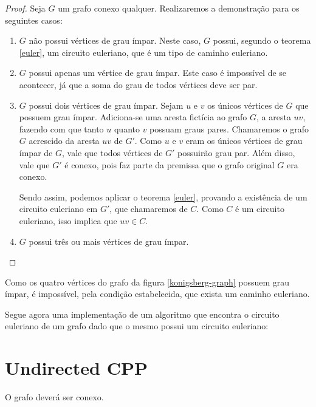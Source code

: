 \documentclass{article}
\begin{document}
\begin{proof}
    Seja $G$ um grafo conexo qualquer. Realizaremos a demonstração para os seguintes casos:
    \begin{enumerate}
        \item $G$ não possui vértices de grau ímpar. Neste caso, $G$ possui, segundo o teorema \ref{euler}, um circuito euleriano, que é um tipo de caminho euleriano.
        
        \item $G$ possui apenas um vértice de grau ímpar. Este caso é impossível de se acontecer, já que a soma do grau de todos vértices deve ser par.
        
        \item $G$ possui dois vértices de grau ímpar. 
        Sejam $u$ e $v$ os únicos vértices de $G$ que possuem grau ímpar.
        Adiciona-se uma aresta fictícia ao grafo $G$, a aresta $uv$, fazendo com que tanto $u$ quanto $v$ possuam graus pares. 
		Chamaremos o grafo $G$ acrescido da aresta $uv$ de $G'$.
        Como $u$ e $v$ eram os únicos vértices de grau ímpar de $G$, vale que todos vértices de $G'$ possuirão grau par. 
		Além disso, vale que $G'$ é conexo, pois faz parte da premissa que o grafo original $G$ era conexo.

        Sendo assim, podemos aplicar o teorema \ref{euler}, provando a existência de um circuito euleriano em $G'$, que chamaremos de $C$.
        Como $C$ é um circuito euleriano, isso implica que $uv \in C$.

        \item $G$ possui três ou mais vértices de grau ímpar.
    \end{enumerate}
\end{proof}


Como os quatro vértices do grafo da figura \ref{konigsberg-graph} possuem grau ímpar, é impossível, pela condição estabelecida, que exista um caminho euleriano.


Segue agora uma implementação de um algoritmo que encontra o circuito euleriano de um grafo dado que o mesmo possui um circuito euleriano:


 

\section{Undirected CPP}

O grafo deverá ser conexo.
\\
\end{document}
